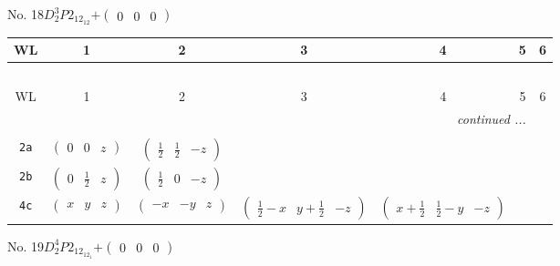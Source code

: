 \documentclass[fleqn,9pt,landscape]{jsarticle}
\begin{document}
\newpage
No. 18\quad$D_{2}^{3}$\quad$P2_12_12$\quad[ orthorhombic ]\quad$+\begin{pmatrix} 0 & 0 & 0 \end{pmatrix}$
\begin{center}
\renewcommand{\arraystretch}{1.2}
\begin{longtable}{ccccccc}
 \hline \hline
WL & 1 & 2 & 3 & 4 & 5 & 6 \\ \hline \endfirsthead

\multicolumn{6}{l}{\tablename\ \thetable{}} \\
 \hline \hline
WL & 1 & 2 & 3 & 4 & 5 & 6 \\ \hline \endhead

 \hline \hline
\multicolumn{6}{r}{\footnotesize\it continued ...} \\ \endfoot

 \hline \hline
\multicolumn{6}{r}{} \\ \endlastfoot

{\tt 2a} & $ \begin{pmatrix} 0 & 0 & z \end{pmatrix} $ & $ \begin{pmatrix} \frac{1}{2} & \frac{1}{2} & - z \end{pmatrix} $ & $  $ & $  $ \\ \hline
{\tt 2b} & $ \begin{pmatrix} 0 & \frac{1}{2} & z \end{pmatrix} $ & $ \begin{pmatrix} \frac{1}{2} & 0 & - z \end{pmatrix} $ & $  $ & $  $ \\ \hline
{\tt 4c} & $ \begin{pmatrix} x & y & z \end{pmatrix} $ & $ \begin{pmatrix} - x & - y & z \end{pmatrix} $ & $ \begin{pmatrix} \frac{1}{2} - x & y + \frac{1}{2} & - z \end{pmatrix} $ & $ \begin{pmatrix} x + \frac{1}{2} & \frac{1}{2} - y & - z \end{pmatrix} $ \\
\end{longtable}
\end{center}
\newpage
No. 19\quad$D_{2}^{4}$\quad$P2_12_12_1$\quad[ orthorhombic ]\quad$+\begin{pmatrix} 0 & 0 & 0 \end{pmatrix}$
\end{document}
